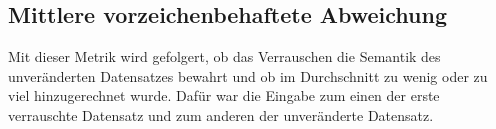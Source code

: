 \subsection{Mittlere vorzeichenbehaftete Abweichung}
Mit dieser Metrik wird gefolgert, ob das Verrauschen die Semantik des unveränderten Datensatzes bewahrt und ob im Durchschnitt zu wenig oder zu viel hinzugerechnet wurde. Dafür war die Eingabe zum einen der erste verrauschte Datensatz und zum anderen der unveränderte Datensatz.
\begin{figure}[htbp]
	\centering
	 \qquad
\end{figure}
